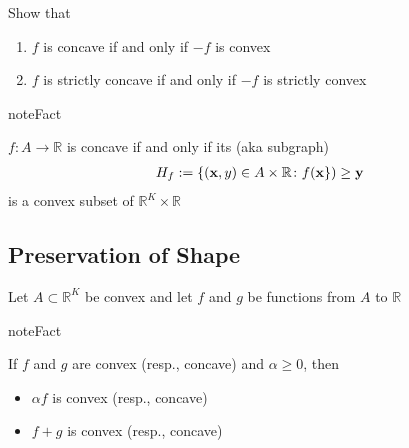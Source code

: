 \documentclass[letterpaper,10pt,english]{jupyterBook}
\begin{document}
\sphinxAtStartPar
{} Show that
\begin{enumerate}
%
\item {} 
\sphinxAtStartPar
\(f\) is concave if and only if \(-f\) is convex

\item {} 
\sphinxAtStartPar
\(f\) is strictly concave if and only if \(-f\) is strictly convex

\end{enumerate}

\begin{sphinxadmonition}{note}{Fact}

\sphinxAtStartPar
\(f \colon A \to \mathbb{R}\) is concave if and only if its  (aka subgraph)
\begin{equation*}
\begin{split}
%
H_f := \{ ({\bf x}, y) \in A \times \mathbb{R} \colon f({\bf x \}) \geq y}
%
\end{split}
\end{equation*}
\sphinxAtStartPar
is a convex subset of \(\mathbb{R}^K \times \mathbb{R}\)
\end{sphinxadmonition}

\begin{figure}[htbp]
\centering

\noindent{}
\end{figure}


\subsection{Preservation of Shape}
\label{\detokenize{06.optimization_fundamentals:preservation-of-shape}}
\sphinxAtStartPar
Let \(A \subset \mathbb{R}^K\) be convex and let \(f\) and \(g\) be functions from \(A\)
to \(\mathbb{R}\)

\begin{sphinxadmonition}{note}{Fact}

\sphinxAtStartPar
If \(f\) and \(g\) are convex (resp., concave) and \(\alpha \geq 0\), then
\begin{itemize}
\item {} 
\sphinxAtStartPar
\(\alpha f\) is convex (resp., concave)

\item {} 
\sphinxAtStartPar
\(f + g\) is convex (resp., concave)

\end{itemize}
\end{sphinxadmonition}
\end{document}
